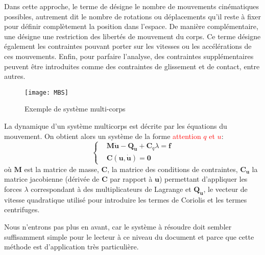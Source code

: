 \medskip
Dans cette approche, le terme de  désigne le nombre de mouvements cinématiques possibles, autrement dit le nombre de rotations ou déplacements qu'il reste à fixer pour définir complètement la position dans l'espace. De manière complémentaire, une  désigne une restriction des libertés de mouvement du corps. Ce terme désigne également les contraintes pouvant porter sur les vitesses ou les accélérations de ces mouvements. Enfin, pour parfaire l'analyse, des contraintes supplémentaires peuvent être introduites comme des contraintes de glissement et de contact, entre autres.
\begin{figure}[ht]
\centering
\texttt{[image: MBS]}
\caption{Exemple de système multi-corps}
\end{figure}
\medskipvm
La dynamique d'un système multicorps est décrite par les équations du mouvement. On obtient alors un système de la forme \textcolor{red}{attention $q$ et $u$}:
\begin{equation}%
\left\{%
\begin{aligned}%
&\mathbf{M}\ddot{\mathbf{u}}-\mathbf{Q}_{\dot{\mathbf{u}}}+\mathbf{C}_q\lambda = \mathbf{f}\\
&\mathbf{C}(\mathbf{u},\dot{\mathbf{u}})=\mathbf{0}
\end{aligned}\right.%
\end{equation}%
où $\mathbf{M}$ est la matrice de masse, $\mathbf{C}$, la matrice des conditions de contraintes, $\mathbf{C}_\mathbf{u}$ la matrice jacobienne (dérivée de $\mathbf{C}$ par rapport à $\mathbf{u}$) permettant d'appliquer les forces $\lambda$ correspondant à des multiplicateurs de Lagrange et $\mathbf{Q}_{\dot{\mathbf{u}}}$, le vecteur de vitesse quadratique utilisé pour introduire les termes de Coriolis et les termes centrifuges.

\medskip
Nous n'entrons pas plus en avant, car le système à résoudre doit sembler suffisamment simple pour le lecteur à ce niveau du document et parce que cette méthode est d'application très particulière.
